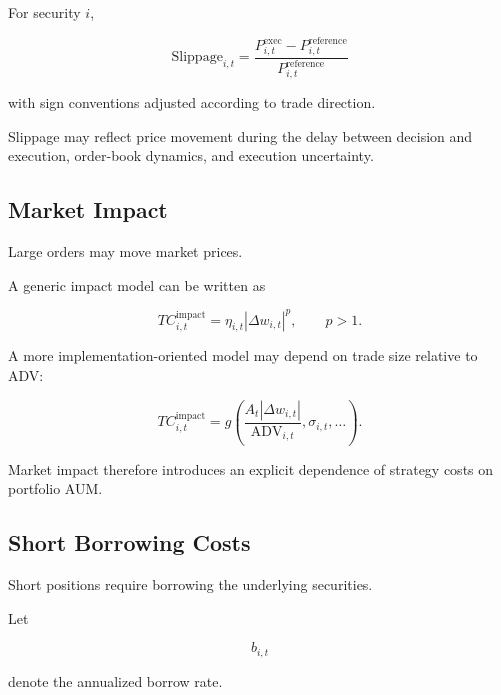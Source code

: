 \documentclass[11pt,a4paper]{article}
\begin{document}
For security $i$,

\begin{equation}
\boxed{
\mathrm{Slippage}_{i,t}
=
\frac{
P_{i,t}^{\mathrm{exec}}
-
P_{i,t}^{\mathrm{reference}}
}{
P_{i,t}^{\mathrm{reference}}
}
}
\end{equation}

with sign conventions adjusted according to trade direction.

Slippage may reflect price movement during the delay between decision and
execution, order-book dynamics, and execution uncertainty.


\subsection{Market Impact}

Large orders may move market prices.

A generic impact model can be written as

\begin{equation}
\boxed{
TC_{i,t}^{\mathrm{impact}}
=
\eta_{i,t}
|\Delta w_{i,t}|^{p},
\qquad
p>1.
}
\end{equation}

A more implementation-oriented model may depend on trade size relative to ADV:

\begin{equation}
TC_{i,t}^{\mathrm{impact}}
=
g
\left(
\frac{
A_t|\Delta w_{i,t}|
}{
\mathrm{ADV}_{i,t}
},
\sigma_{i,t},
\ldots
\right).
\end{equation}

Market impact therefore introduces an explicit dependence of strategy costs on
portfolio AUM.


\subsection{Short Borrowing Costs}

Short positions require borrowing the underlying securities.

Let

\begin{equation}
b_{i,t}
\end{equation}

denote the annualized borrow rate.
\end{document}
